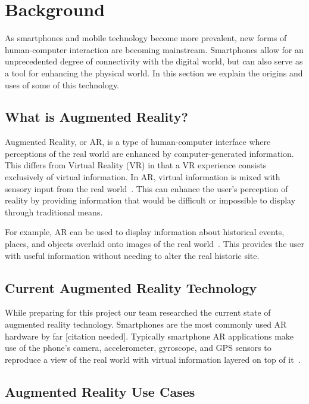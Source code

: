 \documentclass[a4paper, 10pt, american, titlepage]{article}
\begin{document}
\newpage

\section{Background}
\label{sec:background}

As smartphones and mobile technology become more prevalent,
new forms of human-computer interaction are becoming mainstream. Smartphones
allow for an unprecedented degree of connectivity with the digital world, but
can also serve as a tool for enhancing the physical world. In this section we
explain the origins and uses of some of this technology.

\subsection{What is Augmented Reality?}
\label{sec:whatIsAugmentedReality}

Augmented Reality, or AR, is a type of human-computer interface where
perceptions of the real world are enhanced by computer-generated information.
This differs from Virtual Reality (VR) in that a VR experience consists
exclusively of virtual information. In AR, virtual information is mixed with
sensory input from the real world~\autocite{carmigniani2011}. This can enhance
the user's perception of reality by providing information that would be
difficult or impossible to display through traditional means.

For example, AR can be used to display information about historical events,
places, and objects overlaid onto images of the real world~\autocite{saenz2009}.
This provides the user with useful information without needing to alter the real
historic site.

\subsection{Current Augmented Reality Technology}
\label{sec:currentAugmentedRealityTechnology}

While preparing for this project our team researched the current state of
augmented reality technology. Smartphones are the most commonly used AR
hardware by far [citation needed]. Typically smartphone AR applications make
use of the phone's camera, accelerometer, gyroscope, and GPS sensors to
reproduce a view of the real world with virtual information layered on top of
it~\autocite{bonsor2018}.

\subsection{Augmented Reality Use Cases}
\label{sec:augmentedRealityUseCases}
\end{document}
